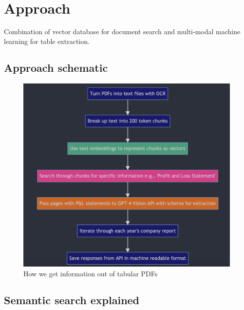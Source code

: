 \documentclass[
  letterpaper,
  DIV=11,
  numbers=noendperiod]{scrartcl}
\begin{document}
\hypertarget{sec-approach}{%
\section{Approach}\label{sec-approach}}

Combination of vector database for document search and multi-modal
machine learning for table extraction.

\hypertarget{approach-schematic}{%
\subsection{Approach schematic}\label{approach-schematic}}

\begin{figure}

{\centering \includegraphics{assets/mermaid.png}

}

\caption{How we get information out of tabular PDFs}

\end{figure}

\hypertarget{semantic-search-explained}{%
\subsection{Semantic search explained}\label{semantic-search-explained}}
\end{document}
